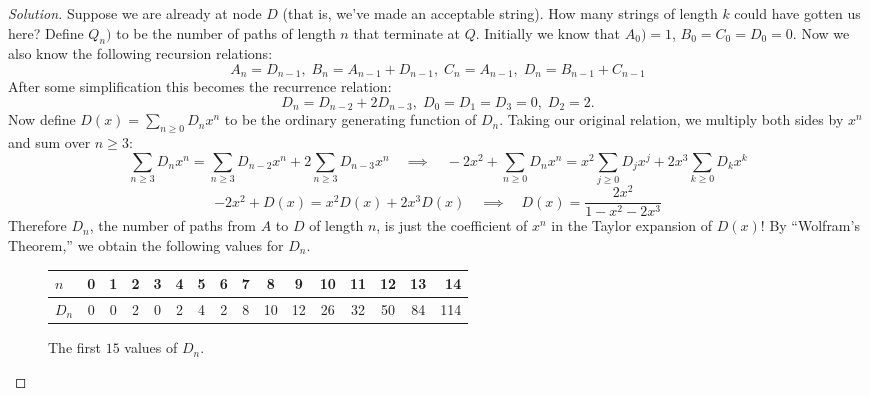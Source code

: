 \begin{proof}[Solution]
Suppose we are already at node $D$ (that is, we've made an acceptable string). How many strings of length $k$ could have gotten us here? Define $Q_n)$ to be the number of paths of length $n$ that terminate at $Q$. Initially we know that $A_0) = 1$, $B_0 = C_0 = D_0 = 0$. Now we also know the following recursion relations:
\[
A_n = D_{n - 1},\;
B_n = A_{n - 1} + D_{n - 1},\;
C_n = A_{n - 1},\;
D_n = B_{n - 1} + C_{n - 1}
\]
After some simplification this becomes the recurrence relation:
\[
D_n = D_{n - 2} + 2 D_{n - 3},\;
D_0 = D_1 = D_3 = 0,\;
D_2 = 2.\]
Now define $D(x) = \sum_{n \geq 0} D_n x^n$ to be the ordinary generating function of $D_n$. Taking our original relation, we multiply both sides by $x^n$ and sum over $n \geq 3$:
\[
\sum_{n \geq 3} D_n x^n = \sum_{n \geq 3} D_{n - 2} x^n + 2 \sum_{n \geq 3} D_{n - 3} x^n \quad \implies \quad
-2x^2 + \sum_{n \geq 0} D_n x^n = x^2 \sum_{j \geq 0} D_{j} x^j + 2 x^3 \sum_{k \geq 0} D_{k} x^k
\]
\[
-2x^2 + D(x) = x^2 D(x) + 2x^3 D(x) \quad \implies \quad
D(x) = \frac{2x^2}{1 - x^2 - 2x^3}
\]
Therefore $D_n$, the number of paths from $A$ to $D$ of length $n$, is just the coefficient of $x^n$ in the Taylor expansion of $D(x)$! By ``Wolfram's Theorem,'' we obtain the following values for $D_n$.
\begin{figure}[ht]
\setlength\tabcolsep{9pt}
\centering
\begin{tabular}{l || c | c | c | c | c | c | c | c | c | c | c | c | c | c | r}
$n$   &   0 &   1 &   2 &   3 &   4 &   5 &   6 &   7 &   8 &   9 &  10 &  11 &  12 &  13 &  14 \\
\hline
$D_n$ &   0 &   0 &   2 &   0 &   2 &   4 &   2 &   8 &  10 &  12 &  26 &  32 &  50 &  84 & 114 \\
\end{tabular}
\label{}
\caption{The first $15$ values of $D_n$.}
\end{figure}
\end{proof}

